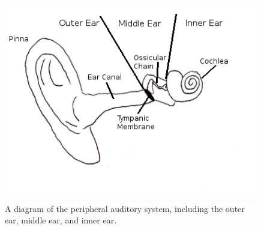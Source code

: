 \DIFdelbegin %
\DIFdelend \DIFaddbegin \begin{figure}[H]
\DIFaddendFL \centering
  \DIFdelbeginFL %
\DIFdelendFL \DIFaddbeginFL \includegraphics[width=.75\textwidth]{figure/ear-diagram.png}
  \DIFaddendFL \caption{A diagram of the peripheral auditory system, including the outer ear, middle ear, and inner ear\DIFdelbeginFL {}\DIFdelendFL .\DIFdelbeginFL {}\DIFdelendFL }
  \label{fig:ear-anatomy}
\end{figure}

